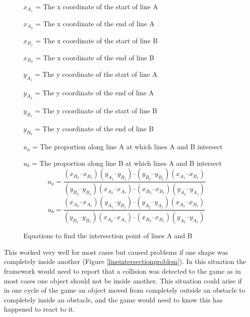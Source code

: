 \documentclass[]{report}
\begin{document}
			\begin{figure}[H]
				\centering
				$x_{A_{1}}$ = The x coordinate of the start of line A
				
				$x_{A_{2}}$ = The x coordinate of the end of line A
				
				$x_{B_{1}}$ = The x coordinate of the start of line B
				
				$x_{B_{2}}$ = The x coordinate of the end of line B
				
				$y_{A_{1}}$ = The y coordinate of the start of line A
				
				$y_{A_{2}}$ = The y coordinate of the end of line A
				
				$y_{B_{1}}$ = The y coordinate of the start of line B
				
				$y_{B_{2}}$ = The y coordinate of the end of line B
				
				$u_{a}$ = The proportion along line A at which lines A and B intersect
				
				$u_{b}$ = The proportion along line B at which lines A and B intersect
				\begin{displaymath}
				u_{a} = \frac
				{(x_{B_{2}}–x_{B_{1}})(y_{A_{1}}–y_{B_{1}})–(y_{B_{2}}–y_{B_{1}})(x_{A_{1}}–x_{B_{1}})}
				{(y_{B_{2}}–y_{B_{1}})(x_{A_{2}}–x_{A_{1}})–(x_{B_{2}}–x_{B_{1}})(y_{A_{2}}–y_{A_{1}})}
				\end{displaymath}
				\begin{displaymath}
				u_{b} = \frac
				{(x_{A_{2}}–x_{A_{1}})(y_{A_{1}}–y_{B_{1}})–(y_{A_{2}}–y_{A_{1}})(x_{A_{1}}–x_{B_{1}})}
				{(y_{B_{2}}–y_{B_{1}})(x_{A_{2}}–x_{A_{1}})–(x_{B_{2}}–x_{B_{1}})(y_{A_{2}}–y_{A_{1}})}
				\end{displaymath}
				\caption{Equations to find the intersection point of lines A and B \cite{linecollisionsite}}
				\label{lineintersectionequation}
			\end{figure}
			
			This worked very well for most cases but caused problems if one shape was completely inside another (Figure \ref{lineintersectionproblem}). In this situation the framework would need to report that a collision was detected to the game as in most cases one object should not be inside another. This situation could arise if in one cycle of the game an object moved from completely outside an obstacle to completely inside an obstacle, and the game would need to know this has happened to react to it.
			
\end{document}
